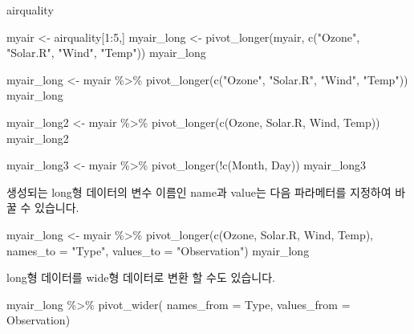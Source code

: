 \documentclass[
]{book}
\newenvironment{Shaded}{\begin{snugshade}}{\end{snugshade}}
\newcommand{\AttributeTok}[1]{\textcolor[rgb]{0.77,0.63,0.00}{#1}}
\newcommand{\DecValTok}[1]{\textcolor[rgb]{0.00,0.00,0.81}{#1}}
\newcommand{\FunctionTok}[1]{\textcolor[rgb]{0.00,0.00,0.00}{#1}}
\newcommand{\NormalTok}[1]{#1}
\newcommand{\OtherTok}[1]{\textcolor[rgb]{0.56,0.35,0.01}{#1}}
\newcommand{\SpecialCharTok}[1]{\textcolor[rgb]{0.00,0.00,0.00}{#1}}
\newcommand{\StringTok}[1]{\textcolor[rgb]{0.31,0.60,0.02}{#1}}
\begin{document}
\begin{Shaded}
\begin{Highlighting}[]
\NormalTok{airquality}

\NormalTok{myair }\OtherTok{\textless{}{-}}\NormalTok{ airquality[}\DecValTok{1}\SpecialCharTok{:}\DecValTok{5}\NormalTok{,]}
\NormalTok{myair\_long }\OtherTok{\textless{}{-}} \FunctionTok{pivot\_longer}\NormalTok{(myair, }\FunctionTok{c}\NormalTok{(}\StringTok{"Ozone"}\NormalTok{, }\StringTok{"Solar.R"}\NormalTok{, }\StringTok{"Wind"}\NormalTok{, }\StringTok{"Temp"}\NormalTok{))}
\NormalTok{myair\_long }

\NormalTok{myair\_long }\OtherTok{\textless{}{-}}\NormalTok{ myair }\SpecialCharTok{\%\textgreater{}\%} 
  \FunctionTok{pivot\_longer}\NormalTok{(}\FunctionTok{c}\NormalTok{(}\StringTok{"Ozone"}\NormalTok{, }\StringTok{"Solar.R"}\NormalTok{, }\StringTok{"Wind"}\NormalTok{, }\StringTok{"Temp"}\NormalTok{))}
\NormalTok{myair\_long }

\NormalTok{myair\_long2 }\OtherTok{\textless{}{-}}\NormalTok{ myair }\SpecialCharTok{\%\textgreater{}\%} 
  \FunctionTok{pivot\_longer}\NormalTok{(}\FunctionTok{c}\NormalTok{(Ozone, Solar.R, Wind, Temp))}
\NormalTok{myair\_long2 }

\NormalTok{myair\_long3 }\OtherTok{\textless{}{-}}\NormalTok{ myair }\SpecialCharTok{\%\textgreater{}\%} 
  \FunctionTok{pivot\_longer}\NormalTok{(}\SpecialCharTok{!}\FunctionTok{c}\NormalTok{(Month, Day))}
\NormalTok{myair\_long3}
\end{Highlighting}
\end{Shaded}

생성되는 long형 데이터의 변수 이름인 name과 value는 다음 파라메터를 지정하여 바꿀 수 있습니다.

\begin{Shaded}
\begin{Highlighting}[]


\NormalTok{myair\_long }\OtherTok{\textless{}{-}}\NormalTok{ myair }\SpecialCharTok{\%\textgreater{}\%} 
  \FunctionTok{pivot\_longer}\NormalTok{(}\FunctionTok{c}\NormalTok{(Ozone, Solar.R, Wind, Temp), }
               \AttributeTok{names\_to =} \StringTok{"Type"}\NormalTok{, }
               \AttributeTok{values\_to =} \StringTok{"Observation"}\NormalTok{)}
\NormalTok{myair\_long }
\end{Highlighting}
\end{Shaded}

long형 데이터를 wide형 데이터로 변환 할 수도 있습니다.

\begin{Shaded}
\begin{Highlighting}[]
\NormalTok{myair\_long }\SpecialCharTok{\%\textgreater{}\%} 
  \FunctionTok{pivot\_wider}\NormalTok{(}
    \AttributeTok{names\_from =}\NormalTok{ Type, }
    \AttributeTok{values\_from =}\NormalTok{ Observation)}
\end{Highlighting}
\end{Shaded}
\end{document}

